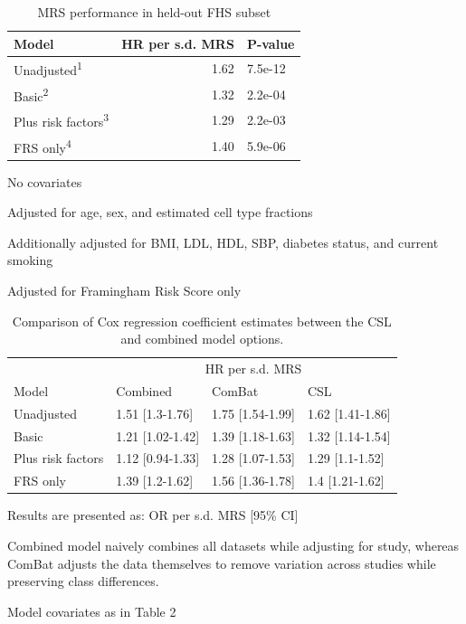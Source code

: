 \documentclass[]{article}
\begin{document}
\begin{table}[t]

\caption{\label{tab:fhs-holdout}MRS performance in held-out FHS subset}
\centering
\begin{threeparttable}
\begin{tabular}{lrl}
\toprule
Model & HR per s.d. MRS & P-value\\
\midrule
Unadjusted\textsuperscript{1} & 1.62 & 7.5e-12\\
Basic\textsuperscript{2} & 1.32 & 2.2e-04\\
Plus risk factors\textsuperscript{3} & 1.29 & 2.2e-03\\
FRS only\textsuperscript{4} & 1.40 & 5.9e-06\\
\bottomrule
\end{tabular}
\begin{tablenotes}
\item[1] No covariates
\item[2] Adjusted for age, sex, and estimated cell type fractions
\item[3] Additionally adjusted for BMI, LDL, HDL, SBP, diabetes status, and current smoking
\item[4] Adjusted for Framingham Risk Score only
\end{tablenotes}
\end{threeparttable}
\end{table}

\begin{table}[t]

\caption{\label{tab:fhs-holdout}Comparison of Cox regression coefficient estimates between the CSL and combined model options.}
\centering
\begin{threeparttable}
\begin{tabular}{llll}
\toprule
\multicolumn{1}{c}{} & \multicolumn{3}{c}{HR per s.d. MRS} \\
\cmidrule(l{3pt}r{3pt}){2-4}
Model & Combined & ComBat & CSL\\
\midrule
Unadjusted & 1.51 [1.3-1.76] & 1.75 [1.54-1.99] & 1.62 [1.41-1.86]\\
Basic & 1.21 [1.02-1.42] & 1.39 [1.18-1.63] & 1.32 [1.14-1.54]\\
Plus risk factors & 1.12 [0.94-1.33] & 1.28 [1.07-1.53] & 1.29 [1.1-1.52]\\
FRS only & 1.39 [1.2-1.62] & 1.56 [1.36-1.78] & 1.4 [1.21-1.62]\\
\bottomrule
\end{tabular}
\begin{tablenotes}
\item * Results are presented as: OR per s.d. MRS [95\% CI]
\item * Combined model naively combines all datasets while adjusting for study, whereas ComBat adjusts the data themselves to remove variation across studies while preserving class differences.
\item * Model covariates as in Table 2
\end{tablenotes}
\end{threeparttable}
\end{table}
\end{document}
